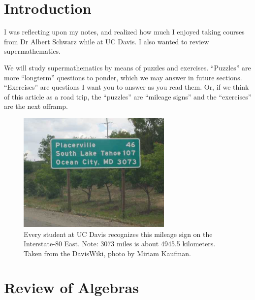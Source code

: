 \section*{Introduction}

\M I was reflecting upon my notes, and realized how much I enjoyed
taking courses from Dr Albert Schwarz while at UC Davis. I also wanted
to review supermathematics.

\M
We will study supermathematics by means of puzzles and exercises.
``Puzzles'' are more ``longterm'' questions to ponder, which we may
answer in future sections. ``Exercises'' are questions I want you to
answer as you read them. Or, if we think of this article as a road
trip, the ``puzzles'' are ``mileage signs'' and the ``exercises'' are the
next offramp.

\begin{figure}[h]
  \centering
  \includegraphics[width=7.55cm]{img/ocean-city.JPG}
  \caption[Mileage sign]{Every student at UC Davis recognizes this mileage sign on the
    Interstate-80 East. Note: 3073 miles is about 4945.5 kilometers. Taken from the DavisWiki, photo by Miriam Kaufman.\footnotemark}
\end{figure}

\section{Review of Algebras}

